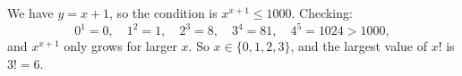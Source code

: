 We have $y=x+1$, so the condition is $x^{x+1}\le1000$. Checking:
\[
0^1=0,\quad 1^2=1,\quad 2^3=8,\quad 3^4=81,\quad 4^5=1024>1000,
\]
and $x^{x+1}$ only grows for larger $x$. So $x\in\{0,1,2,3\}$, and the largest value of $x!$ is $3!=\boxed{6}$.
